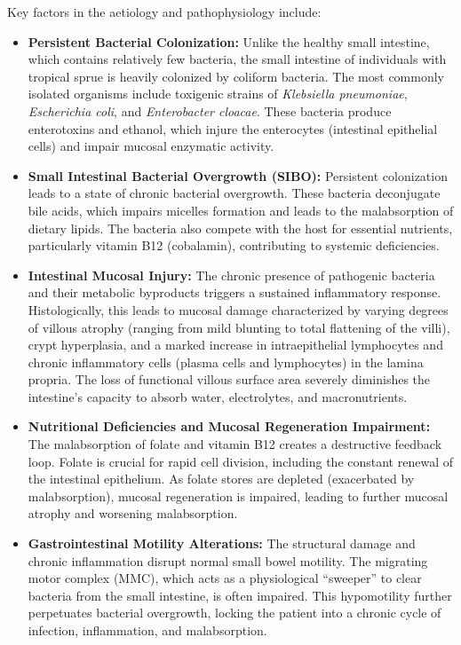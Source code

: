 Key factors in the aetiology and pathophysiology include:
\begin{itemize}
    \item \textbf{Persistent Bacterial Colonization:} Unlike the healthy small intestine, which contains relatively few bacteria, the small intestine of individuals with tropical sprue is heavily colonized by coliform bacteria. The most commonly isolated organisms include toxigenic strains of \textit{Klebsiella pneumoniae}, \textit{Escherichia coli}, and \textit{Enterobacter cloacae}. These bacteria produce enterotoxins and ethanol, which injure the enterocytes (intestinal epithelial cells) and impair mucosal enzymatic activity.
    \item \textbf{Small Intestinal Bacterial Overgrowth (SIBO):} Persistent colonization leads to a state of chronic bacterial overgrowth. These bacteria deconjugate bile acids, which impairs micelles formation and leads to the malabsorption of dietary lipids. The bacteria also compete with the host for essential nutrients, particularly vitamin B12 (cobalamin), contributing to systemic deficiencies.
    \item \textbf{Intestinal Mucosal Injury:} The chronic presence of pathogenic bacteria and their metabolic byproducts triggers a sustained inflammatory response. Histologically, this leads to mucosal damage characterized by varying degrees of villous atrophy (ranging from mild blunting to total flattening of the villi), crypt hyperplasia, and a marked increase in intraepithelial lymphocytes and chronic inflammatory cells (plasma cells and lymphocytes) in the lamina propria. The loss of functional villous surface area severely diminishes the intestine's capacity to absorb water, electrolytes, and macronutrients.
    \item \textbf{Nutritional Deficiencies and Mucosal Regeneration Impairment:} The malabsorption of folate and vitamin B12 creates a destructive feedback loop. Folate is crucial for rapid cell division, including the constant renewal of the intestinal epithelium. As folate stores are depleted (exacerbated by malabsorption), mucosal regeneration is impaired, leading to further mucosal atrophy and worsening malabsorption.
    \item \textbf{Gastrointestinal Motility Alterations:} The structural damage and chronic inflammation disrupt normal small bowel motility. The migrating motor complex (MMC), which acts as a physiological ``sweeper'' to clear bacteria from the small intestine, is often impaired. This hypomotility further perpetuates bacterial overgrowth, locking the patient into a chronic cycle of infection, inflammation, and malabsorption.
\end{itemize}

